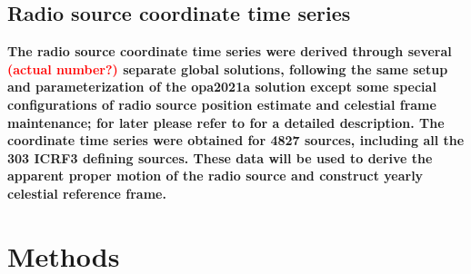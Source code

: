 \documentclass{aa}
\begin{document}

\subsection{Radio source coordinate time series}  \label{subsec:ts-data}

    \textbf{The radio source coordinate time series were derived through several \textcolor{red}{(actual number?)} separate global solutions, following the same setup and parameterization of the opa2021a solution except some special configurations of radio source position estimate and celestial frame maintenance; for later please refer to \citet{2013A&A...553A.122L} for a detailed description.
    The coordinate time series were obtained for 4827 sources, including all the 303 ICRF3 defining sources.
   These data will be used to derive the apparent proper motion of the radio source and construct yearly celestial reference frame.}

   

\section{Methods}  \label{sec:methods}
\end{document}
